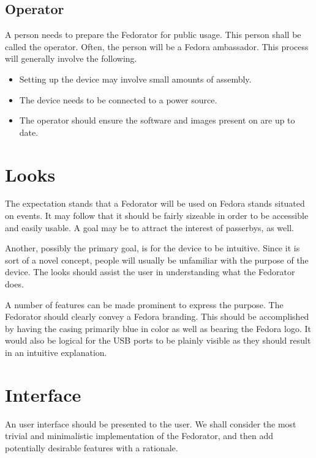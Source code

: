         \subsection{Operator}
            A person needs to prepare the Fedorator for public usage.  This person shall be called the operator.  Often, the person will be a Fedora ambassador.  This process will generally involve the following.
            
            \begin{itemize}
                \item Setting up the device may involve small amounts of assembly.
                \item The device needs to be connected to a power source.
                \item The operator should ensure the software and images present on are up to date.
            \end{itemize}
    \section{Looks}
        The expectation stands that a Fedorator will be used on Fedora stands situated on events.  It may follow that it should be fairly sizeable in order to be accessible and easily usable.  A goal may be to attract the interest of passerbys, as well.
        
        Another, possibly the primary goal, is for the device to be intuitive.  Since it is sort of a novel concept, people will usually be unfamiliar with the purpose of the device.  The looks should assist the user in understanding what the Fedorator does.
        
        A number of features can be made prominent to express the purpose.  The Fedorator should clearly convey a Fedora branding.  This should be accomplished by having the casing primarily blue in color as well as bearing the Fedora logo.  It would also be logical for the USB ports to be plainly visible as they should result in an intuitive explanation.
        
        
        
    \section{Interface}
        An user interface should be presented to the user.  We shall consider the most trivial and minimalistic implementation of the Fedorator, and then add potentially desirable features with a rationale.
        
